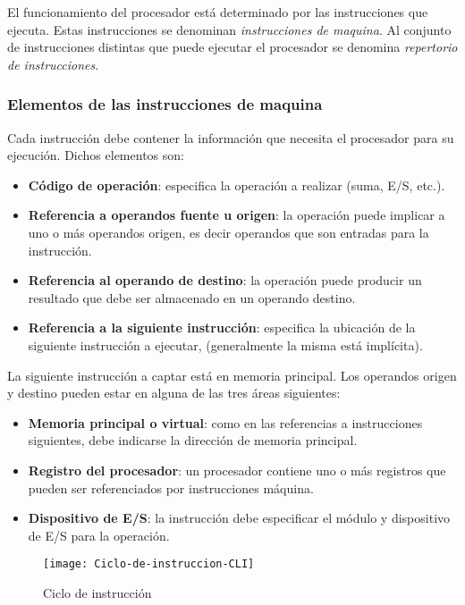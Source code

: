 El funcionamiento del procesador está determinado por las instrucciones que ejecuta. Estas instrucciones se denominan \textit{instrucciones de maquina}. Al conjunto de instrucciones distintas que puede ejecutar el procesador se denomina \textit{repertorio de instrucciones}.

\begin{subs}
  \subsubsection{Elementos de las instrucciones de maquina}

  Cada instrucción debe contener la información que necesita el procesador para su ejecución. Dichos elementos son:

  \begin{itemize}
    \item \textbf{Código de operación}: especifica la operación a realizar (suma, E/S, etc.).
    \item \textbf{Referencia a operandos fuente u origen}: la operación puede implicar a uno o más operandos origen, es decir operandos que son entradas para la instrucción.
    \item \textbf{Referencia al operando de destino}: la operación puede producir un resultado que debe ser almacenado en un operando destino.
    \item \textbf{Referencia a la siguiente instrucción}: especifica la ubicación de la siguiente instrucción a ejecutar, (generalmente la misma está implícita).
  \end{itemize}

  La siguiente instrucción a captar está en memoria principal. Los operandos origen y destino pueden estar en alguna de las tres áreas siguientes:

  \begin{itemize}
    \item \textbf{Memoria principal o virtual}: como en las referencias a instrucciones siguientes, debe indicarse la dirección de memoria principal.
    \item \textbf{Registro del procesador}: un procesador contiene uno o más registros que pueden ser referenciados por instrucciones máquina.
    \item \textbf{Dispositivo de E/S}: la instrucción debe especificar el módulo y dispositivo de E/S para la operación.
  \end{itemize}

  \begin{figure}[H]
    \centering
    \texttt{[image: Ciclo-de-instruccion-CLI]}
    \caption{Ciclo de instrucción}
  \end{figure}


\end{subs}
